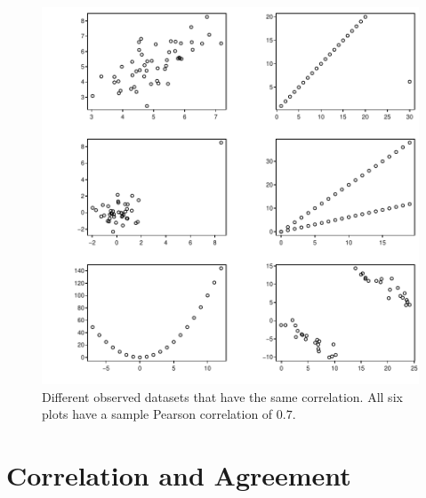 \begin{Schunk}
\begin{figure}[htbp]
\centerline{\includegraphics{corr-corrplotb-1} }

\caption[Multiple datasets having same Pearson $r$]{Different observed datasets that have the same correlation.  All six plots have a sample Pearson correlation of $0.7$.}\label{fig:corr-corrplotb}
\end{figure}
\end{Schunk}


\clearpage
\section{Correlation and Agreement}

